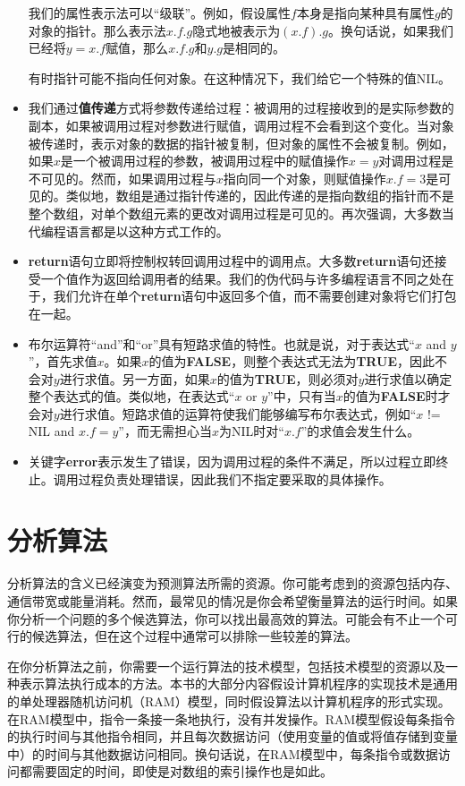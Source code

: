 \documentclass[lang=cn,newtx,10pt,scheme=chinese]{elegantbook}
\begin{document}
\begin{itemize}
    我们的属性表示法可以``级联''。例如，假设属性$f$本身是指向某种具有属性$g$的对象的指针。那么表示法$x.f.g$隐式地被表示为$(x.f).g$。换句话说，如果我们已经将$y = x.f$赋值，那么$x.f.g$和$y.g$是相同的。

    有时指针可能不指向任何对象。在这种情况下，我们给它一个特殊的值NIL。
    \item 我们通过\textbf{值传递}方式将参数传递给过程：被调用的过程接收到的是实际参数的副本，如果被调用过程对参数进行赋值，调用过程不会看到这个变化。当对象被传递时，表示对象的数据的指针被复制，但对象的属性不会被复制。例如，如果$x$是一个被调用过程的参数，被调用过程中的赋值操作$x=y$对调用过程是不可见的。然而，如果调用过程与$x$指向同一个对象，则赋值操作$x.f=3$是可见的。类似地，数组是通过指针传递的，因此传递的是指向数组的指针而不是整个数组，对单个数组元素的更改对调用过程是可见的。再次强调，大多数当代编程语言都是以这种方式工作的。
    \item \textbf{return}语句立即将控制权转回调用过程中的调用点。大多数\textbf{return}语句还接受一个值作为返回给调用者的结果。我们的伪代码与许多编程语言不同之处在于，我们允许在单个\textbf{return}语句中返回多个值，而不需要创建对象将它们打包在一起。
    \item 布尔运算符``and''和``or''具有短路求值的特性。也就是说，对于表达式``$x$ and $y$''，首先求值$x$。如果$x$的值为\textbf{FALSE}，则整个表达式无法为\textbf{TRUE}，因此不会对$y$进行求值。另一方面，如果$x$的值为\textbf{TRUE}，则必须对$y$进行求值以确定整个表达式的值。类似地，在表达式``$x$ or $y$''中，只有当$x$的值为\textbf{FALSE}时才会对$y$进行求值。短路求值的运算符使我们能够编写布尔表达式，例如``$x$ != NIL and $x.f=y$''，而无需担心当$x$为NIL时对``$x.f$''的求值会发生什么。
    \item 关键字\textbf{error}表示发生了错误，因为调用过程的条件不满足，所以过程立即终止。调用过程负责处理错误，因此我们不指定要采取的具体操作。
\end{itemize}

\section{分析算法}\label{section-2.2}

分析算法的含义已经演变为预测算法所需的资源。你可能考虑到的资源包括内存、通信带宽或能量消耗。然而，最常见的情况是你会希望衡量算法的运行时间。如果你分析一个问题的多个候选算法，你可以找出最高效的算法。可能会有不止一个可行的候选算法，但在这个过程中通常可以排除一些较差的算法。

在你分析算法之前，你需要一个运行算法的技术模型，包括技术模型的资源以及一种表示算法执行成本的方法。本书的大部分内容假设计算机程序的实现技术是通用的单处理器随机访问机（RAM）模型，同时假设算法以计算机程序的形式实现。在RAM模型中，指令一条接一条地执行，没有并发操作。RAM模型假设每条指令的执行时间与其他指令相同，并且每次数据访问（使用变量的值或将值存储到变量中）的时间与其他数据访问相同。换句话说，在RAM模型中，每条指令或数据访问都需要固定的时间，即使是对数组的索引操作也是如此。
\end{document}
